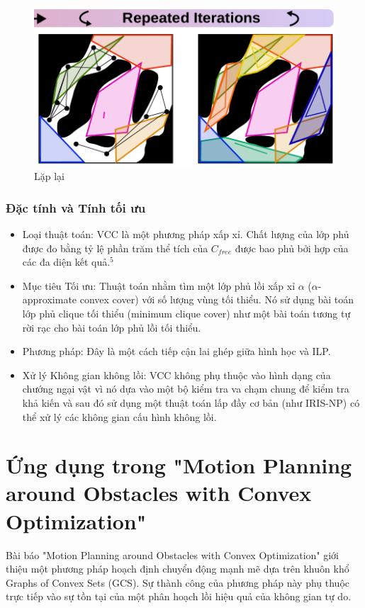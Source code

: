 \documentclass{article}
\begin{document}
\begin{enumerate}
\begin{figure}[H]
    \centering
    \includegraphics[width=0.5\linewidth]{imgs/VCC-5.png}
    \caption{Lặp lại}
\end{figure}

\end{enumerate}

\subsubsection{Đặc tính và Tính tối ưu}

\begin{itemize}
\item Loại thuật toán: VCC là một phương pháp xấp xỉ. Chất lượng của lớp phủ được đo bằng tỷ lệ phần trăm thể tích của $C_{free}$ được bao phủ bởi hợp của các đa diện kết quả.$^5$
\item Mục tiêu Tối ưu: Thuật toán nhằm tìm một lớp phủ lồi xấp xỉ $\alpha$ ($\alpha$-approximate convex cover) với số lượng vùng tối thiểu. Nó sử dụng bài toán lớp phủ clique tối thiểu (minimum clique cover) như một bài toán tương tự rời rạc cho bài toán lớp phủ lồi tối thiểu.\cite{vcc2023}
\item Phương pháp: Đây là một cách tiếp cận lai ghép giữa hình học và ILP.
\item Xử lý Không gian không lồi: VCC không phụ thuộc vào hình dạng của chướng ngại vật vì nó dựa vào một bộ kiểm tra va chạm chung để kiểm tra khả kiến và sau đó sử dụng một thuật toán lấp đầy cơ bản (như IRIS-NP) có thể xử lý các không gian cấu hình không lồi.\cite{vcc2023}
\end{itemize}

\section{Ứng dụng trong "Motion Planning around Obstacles with Convex Optimization"}

Bài báo "Motion Planning around Obstacles with Convex Optimization" giới thiệu một phương pháp hoạch định chuyển động mạnh mẽ dựa trên khuôn khổ Graphs of Convex Sets (GCS). Sự thành công của phương pháp này phụ thuộc trực tiếp vào sự tồn tại của một phân hoạch lồi hiệu quả của không gian tự do.
\end{document}

